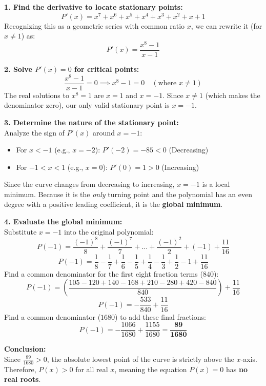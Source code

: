\begin{solution}
\textbf{1. Find the derivative to locate stationary points:}\\
\[
P'(x) = x^7 + x^6 + x^5 + x^4 + x^3 + x^2 + x + 1
\]
Recognizing this as a geometric series with common ratio $x$, we can rewrite it (for $x \neq 1$) as:
\[
P'(x) = \frac{x^8 - 1}{x - 1}
\]

\textbf{2. Solve $P'(x) = 0$ for critical points:}\\
\[
\frac{x^8 - 1}{x - 1} = 0 \implies x^8 - 1 = 0 \quad (\text{where } x \neq 1)
\]
The real solutions to $x^8 = 1$ are $x = 1$ and $x = -1$.
Since $x \neq 1$ (which makes the denominator zero), our only valid stationary point is \textbf{$x = -1$}.

\textbf{3. Determine the nature of the stationary point:}\\
Analyze the sign of $P'(x)$ around $x = -1$:
\begin{itemize}[leftmargin=*]
\item For $x < -1$ (e.g., $x = -2$): $P'(-2) = -85 < 0$ (Decreasing)
\item For $-1 < x < 1$ (e.g., $x = 0$): $P'(0) = 1 > 0$ (Increasing)
\end{itemize}
Since the curve changes from decreasing to increasing, $x = -1$ is a local minimum. Because it is the \emph{only} turning point and the polynomial has an even degree with a positive leading coefficient, it is the \textbf{global minimum}.

\textbf{4. Evaluate the global minimum:}\\
Substitute $x = -1$ into the original polynomial:
\[
P(-1) = \frac{(-1)^8}{8} + \frac{(-1)^7}{7} + \dots + \frac{(-1)^2}{2} + (-1) + \frac{11}{16}
\]
\[
P(-1) = \frac{1}{8} - \frac{1}{7} + \frac{1}{6} - \frac{1}{5} + \frac{1}{4} - \frac{1}{3} + \frac{1}{2} - 1 + \frac{11}{16}
\]
Find a common denominator for the first eight fraction terms ($840$):
\[
P(-1) = \left( \frac{105 - 120 + 140 - 168 + 210 - 280 + 420 - 840}{840} \right) + \frac{11}{16}
\]
\[
P(-1) = -\frac{533}{840} + \frac{11}{16}
\]
Find a common denominator ($1680$) to add these final fractions:
\[
P(-1) = -\frac{1066}{1680} + \frac{1155}{1680} = \mathbf{\frac{89}{1680}}
\]

\textbf{Conclusion:}\\
Since $\frac{89}{1680} > 0$, the absolute lowest point of the curve is strictly above the $x$-axis. Therefore, $P(x) > 0$ for all real $x$, meaning the equation $P(x) = 0$ has \textbf{no real roots}.
\end{solution}

